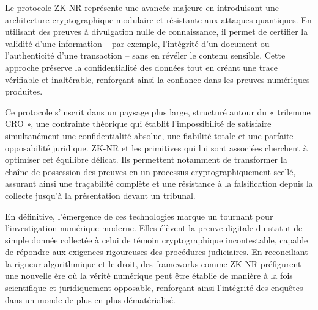 \documentclass[12pt, a4paper]{article}
\begin{document}
		Le protocole ZK-NR représente une avancée majeure en introduisant une architecture cryptographique modulaire et résistante aux attaques quantiques. En utilisant des preuves à divulgation nulle de connaissance, il permet de certifier la validité d'une information -- par exemple, l'intégrité d'un document ou l'authenticité d'une transaction -- sans en révéler le contenu sensible. Cette approche préserve la confidentialité des données tout en créant une trace vérifiable et inaltérable, renforçant ainsi la confiance dans les preuves numériques produites.
		
		Ce protocole s'inscrit dans un paysage plus large, structuré autour du « trilemme CRO », une contrainte théorique qui établit l'impossibilité de satisfaire simultanément une confidentialité absolue, une fiabilité totale et une parfaite opposabilité juridique. ZK-NR et les primitives qui lui sont associées cherchent à optimiser cet équilibre délicat. Ils permettent notamment de transformer la chaîne de possession des preuves en un processus cryptographiquement scellé, assurant ainsi une traçabilité complète et une résistance à la falsification depuis la collecte jusqu'à la présentation devant un tribunal.
		
		En définitive, l'émergence de ces technologies marque un tournant pour l'investigation numérique moderne. Elles élèvent la preuve digitale du statut de simple donnée collectée à celui de témoin cryptographique incontestable, capable de répondre aux exigences rigoureuses des procédures judiciaires. En reconciliant la rigueur algorithmique et le droit, des frameworks comme ZK-NR préfigurent une nouvelle ère où la vérité numérique peut être établie de manière à la fois scientifique et juridiquement opposable, renforçant ainsi l'intégrité des enquêtes dans un monde de plus en plus dématérialisé.
		
		
\end{document}

